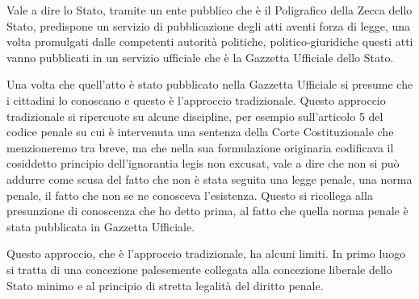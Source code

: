 Vale a dire lo Stato, tramite un ente pubblico che è il Poligrafico della Zecca dello Stato, predispone un servizio di pubblicazione degli atti aventi forza di legge, una volta promulgati dalle competenti autorità politiche, politico-giuridiche questi atti vanno pubblicati in un servizio ufficiale che è la Gazzetta Ufficiale dello Stato.\par 
Una volta che quell'atto è stato pubblicato nella Gazzetta Ufficiale si presume che i cittadini lo conoscano e questo è l'approccio tradizionale. Questo approccio tradizionale si ripercuote su alcune discipline, per esempio sull'articolo 5 del codice penale su cui è intervenuta una sentenza della Corte Costituzionale che menzioneremo tra breve, ma che nella sua formulazione originaria codificava il cosiddetto principio dell'ignorantia legis non excusat, vale a dire che non si può addurre come scusa del fatto che non è stata seguita una legge penale, una norma penale, il fatto che non se ne conosceva l'esistenza. 
Questo si ricollega alla presunzione di conoscenza che ho detto prima, al fatto che quella norma penale è stata pubblicata in Gazzetta Ufficiale. \par
Questo approccio, che è l'approccio tradizionale, ha alcuni limiti. In primo luogo si tratta di una concezione palesemente collegata alla concezione liberale dello Stato minimo e al principio di stretta legalità del diritto penale.


